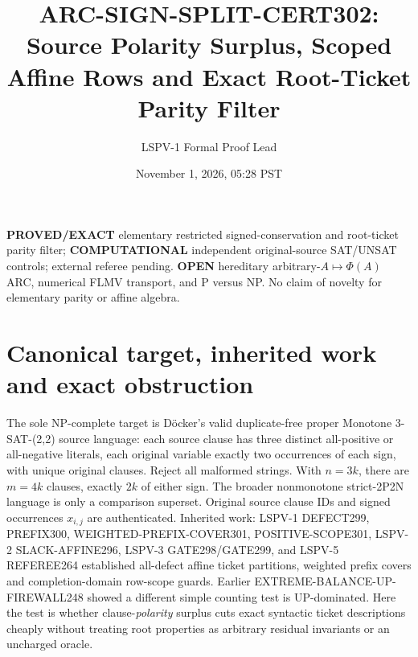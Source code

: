 \documentclass[11pt]{article}
\title{ARC-SIGN-SPLIT-CERT302: Source Polarity Surplus, Scoped Affine Rows and Exact Root-Ticket Parity Filter}
\author{LSPV-1 Formal Proof Lead}
\date{November 1, 2026, 05:28 PST}
\begin{document}
\maketitle
\noindent\textbf{PROVED/EXACT} elementary restricted signed-conservation and root-ticket parity filter; \textbf{COMPUTATIONAL} independent original-source SAT/UNSAT controls; external referee pending. \textbf{OPEN} hereditary arbitrary-$A\mapsto\Phi(A)$ ARC, numerical FLMV transport, and P versus NP. No claim of novelty for elementary parity or affine algebra.

\section{Canonical target, inherited work and exact obstruction}
The sole NP-complete target is D\"ocker's valid duplicate-free proper Monotone 3-SAT-(2,2) source language: each source clause has three distinct all-positive or all-negative literals, each original variable exactly two occurrences of each sign, with unique original clauses. Reject all malformed strings. With $n=3k$, there are $m=4k$ clauses, exactly $2k$ of either sign. The broader nonmonotone strict-2P2N language is only a comparison superset. Original source clause IDs and signed occurrences $x_{i,j}$ are authenticated. Inherited work: LSPV-1 DEFECT299, PREFIX300, WEIGHTED-PREFIX-COVER301, POSITIVE-SCOPE301, LSPV-2 SLACK-AFFINE296, LSPV-3 GATE298/GATE299, and LSPV-5 REFEREE264 established all-defect affine ticket partitions, weighted prefix covers and completion-domain row-scope guards. Earlier EXTREME-BALANCE-UP-FIREWALL248 showed a different simple counting test is UP-dominated. Here the test is whether clause-\emph{polarity} surplus cuts exact syntactic ticket descriptions cheaply without treating root properties as arbitrary residual invariants or an uncharged oracle.
\end{document}
